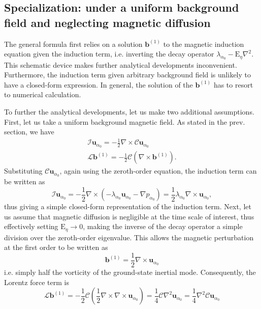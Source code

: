 \subsection{Specialization: under a uniform background field and neglecting magnetic diffusion}

The general formula first relies on a solution $\mathbf{b}^{(1)}$ to the magnetic induction equation given the induction term, i.e. inverting the decay operator $\lambda_{\alpha_0} - \mathrm{E}_\eta \nabla^2$. This schematic device makes further analytical developments inconvenient. Furthermore, the induction term given arbitrary background field is unlikely to have a closed-form expression. In general, the solution of the $\mathbf{b}^{(1)}$ has to resort to numerical calculation.

To further the analytical developments, let us make two additional assumptions. First, let us take a uniform background magnetic field. As stated in the prev. section, we have
%
\begin{gather}
    \mathcal{I} \mathbf{u}_{\alpha_0} = - \frac{1}{2} \nabla\times \mathcal{C} \mathbf{u}_{\alpha_0} \\
    \mathcal{L} \mathbf{b}^{(1)} = - \frac{1}{2} \mathcal{C} (\nabla\times \mathbf{b}^{(1)}).
\end{gather}
%
Substituting $\mathcal{C} \mathbf{u}_{\alpha_0}$, again using the zeroth-order equation, the induction term can be written as 
%
\begin{equation}
    \mathcal{I} \mathbf{u}_{\alpha_0} = - \frac{1}{2} \nabla\times \left(-\lambda_{\alpha_0} \mathbf{u}_{\alpha_0} - \nabla p_{\alpha_0}\right) = \frac{1}{2} \lambda_{\alpha_0} \nabla\times \mathbf{u}_{\alpha_0},
\end{equation}
%
thus giving a simple closed-form representation of the induction term. Next, let us assume that magnetic diffusion is negligible at the time scale of interest, thus effectively setting $\mathrm{E}_\eta \rightarrow 0$, making the inverse of the decay operator a simple division over the zeroth-order eigenvalue. This allows the magnetic perturbation at the first order to be written as 
%
\begin{equation}
    \mathbf{b}^{(1)} = \frac{1}{2} \nabla\times \mathbf{u}_{\alpha_0}
\end{equation}
%
i.e. simply half the vorticity of the ground-state inertial mode. Consequently, the Lorentz force term is
%
\begin{equation}
    \mathcal{L} \mathbf{b}^{(1)} = - \frac{1}{2} \mathcal{C} \left(\frac{1}{2} \nabla \times \nabla\times \mathbf{u}_{\alpha_0} \right) = \frac{1}{4} \mathcal{C} \nabla^2 \mathbf{u}_{\alpha_0} = \frac{1}{4} \nabla^2 \mathcal{C} \mathbf{u}_{\alpha_0}
\end{equation}
